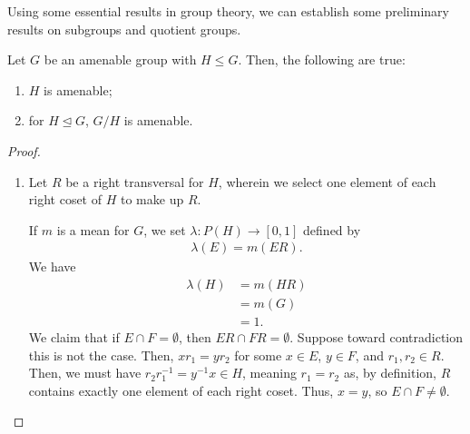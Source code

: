 Using some essential results in group theory, we can establish some preliminary results on subgroups and quotient groups.
\begin{proposition}
  Let $G$ be an amenable group with $H\leq G$. Then, the following are true:
  \begin{enumerate}[(1)]
    \item $H$ is amenable;
    \item for $H\trianglelefteq G$, $G/H$ is amenable.
  \end{enumerate}\label{prop:subgroups_quotientgroups_amenability}
\end{proposition}
\begin{proof}\hfill
  \begin{enumerate}[(1)]
    \item Let $R$ be a right transversal for $H$, wherein we select one element of each right coset of $H$ to make up $R$.\newline

      If $m$ is a mean for $G$, we set $\lambda\colon P(H)\rightarrow [0,1]$ defined by
      \begin{align*}
        \lambda(E) = m\left(ER\right).
      \end{align*}
       We have
      \begin{align*}
        \lambda(H) &= m\left(HR\right)\\
                   &= m\left(G\right)\\
                   &= 1.
      \end{align*}
      We claim that if $E\cap F = \emptyset$, then $ER \cap FR = \emptyset$. Suppose toward contradiction this is not the case. Then, $xr_1 = yr_2$ for some $x\in E$, $y\in F$, and $r_1,r_2\in R$. Then, we must have $r_2r_1^{-1} = y^{-1}x \in H$, meaning $r_1 = r_2$ as, by definition, $R$ contains exactly one element of each right coset. Thus, $x=y$, so $E\cap F \neq \emptyset$.\newline


\end{enumerate}
\end{proof}
